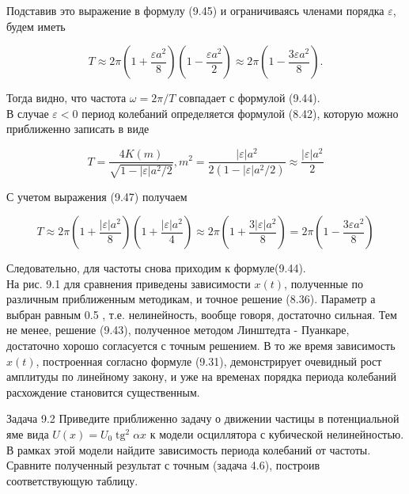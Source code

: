 \documentclass[10pt]{article}
\begin{document}
Подставив это выражение в формулу (9.45) и ограничиваясь членами порядка $\varepsilon$, будем иметь


\begin{equation*}
T \approx 2 \pi\left(1+\frac{\varepsilon a^{2}}{8}\right)\left(1-\frac{\varepsilon a^{2}}{2}\right) \approx 2 \pi\left(1-\frac{3 \varepsilon a^{2}}{8}\right) . \tag{9.48}
\end{equation*}


Тогда видно, что частота $\omega=2 \pi / T$ совпадает с формулой (9.44).\\
В случае $\varepsilon<0$ период колебаний определяется формулой (8.42), которую можно приближенно записать в виде


\begin{equation*}
T=\frac{4 K(m)}{\sqrt{1-|\varepsilon| a^{2} / 2}}, m^{2}=\frac{|\varepsilon| a^{2}}{2\left(1-|\varepsilon| a^{2} / 2\right)} \approx \frac{|\varepsilon| a^{2}}{2} \tag{9.49}
\end{equation*}


С учетом выражения (9.47) получаем


\begin{equation*}
T \approx 2 \pi\left(1+\frac{|\varepsilon| a^{2}}{8}\right)\left(1+\frac{|\varepsilon| a^{2}}{4}\right) \approx 2 \pi\left(1+\frac{3|\varepsilon| a^{2}}{8}\right)=2 \pi\left(1-\frac{3 \varepsilon a^{2}}{8}\right) \tag{9.50}
\end{equation*}


Следовательно, для частоты снова приходим к формуле(9.44).\\
На рис. 9.1 для сравнения приведены зависимости $x(t)$, полученные по различным приближенным методикам, и точное решение (8.36). Параметр а выбран равным 0.5 , т.е. нелинейность, вообще говоря, достаточно сильная. Тем не менее, решение (9.43), полученное методом Линштедта - Пуанкаре, достаточно хорошо согласуется с точным решением. В то же время зависимость $x(t)$, построенная согласно формуле (9.31), демонстрирует очевидный рост амплитуды по линейному закону, и уже на временах порядка периода колебаний расхождение становится существенным.

Задача 9.2 Приведите приближенно задачу о движении частицы в потенциальной яме вида $U(x)=U_{0} \operatorname{tg}^{2} \alpha x$ к модели осциллятора с кубической нелинейностью. В рамках этой модели найдите зависимость периода колебаний от частоты. Сравните полученный результат с точным (задача 4.6), построив соответствующую таблицу.
\end{document}
